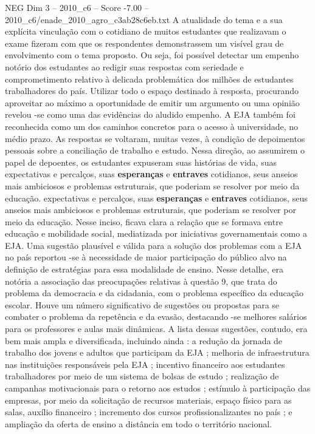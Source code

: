 \begin{textsample}{NEG Dim 3 – 2010\_c6 – Score -7.00 – 2010\_c6/enade\_2010\_agro\_c3ab28c6eb.txt}
A atualidade do tema e a sua explícita vinculação com o cotidiano de muitos estudantes que realizavam o exame fizeram com que os respondentes demonstrassem um visível grau de envolvimento com o tema proposto.
Ou seja, foi possível detectar um empenho notório dos estudantes ao redigir suas respostas com seriedade e comprometimento relativo à delicada problemática dos milhões de estudantes trabalhadores do país.
Utilizar todo o espaço destinado à resposta, procurando aproveitar ao máximo a oportunidade de emitir um argumento ou uma opinião revelou -se como uma das evidências do aludido empenho.
A EJA também foi reconhecida como um dos caminhos concretos para o acesso à universidade, no médio prazo.
As respostas se voltaram, muitas vezes, à condição de depoimentos pessoais sobre a conciliação de trabalho e estudo.
Nessa direção, ao assumirem o papel de depoentes, os estudantes expuseram suas histórias de vida, suas expectativas e percalços, suas \textbf{esperanças} e \textbf{entraves} cotidianos, seus anseios mais ambiciosos e problemas estruturais, que poderiam se resolver por meio da educação. expectativas e percalços, suas \textbf{esperanças} e \textbf{entraves} cotidianos, seus anseios mais ambiciosos e problemas estruturais, que poderiam se resolver por meio da educação.
Nesse inciso, ficava clara a relação que se formava entre educação e mobilidade social, mediatizada por iniciativas governamentais como a EJA.
Uma sugestão plausível e válida para a solução dos problemas com a EJA no país reportou -se à necessidade de maior participação do público alvo na definição de estratégias para essa modalidade de ensino.
Nesse detalhe, era notória a associação das preocupações relativas à questão 9, que trata do problema da democracia e da cidadania, com o problema específico da educação escolar.
Houve um número significativo de sugestões ou propostas para se combater o problema da repetência e da evasão, destacando -se melhores salários para os professores e aulas mais dinâmicas.
A lista dessas sugestões, contudo, era bem mais ampla e diversificada, incluindo ainda : a redução da jornada de trabalho dos jovens e adultos que participam da EJA ; melhoria de infraestrutura nas instituições responsáveis pela EJA ; incentivo financeiro aos estudantes trabalhadores por meio de um sistema de bolsas de estudo ; realização de campanhas motivacionais para o retorno aos estudos ; estímulo à participação das empresas, por meio da solicitação de recursos materiais, espaço físico para as salas, auxílio financeiro ; incremento dos cursos profissionalizantes no país ; e ampliação da oferta de ensino a distância em todo o território nacional.

\end{textsample}
